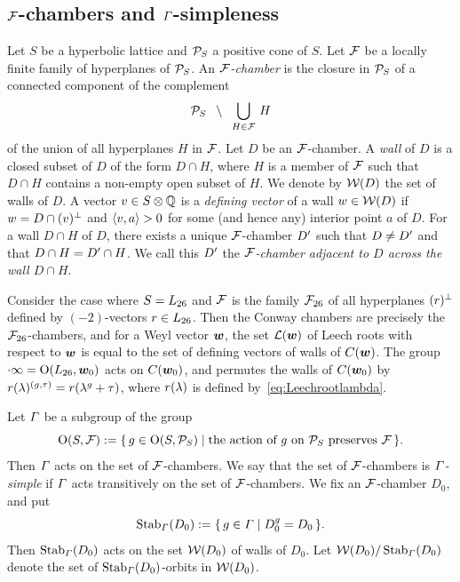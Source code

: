 \documentclass{amsart} %
\begin{document}
\subsection{$\mathord{\mathcal{F}}$-chambers and $\varGamma$-simpleness}\label{subsec:FFF}
%
%
Let $S$ be a hyperbolic lattice
and $\mathord{\mathcal{P}}_S$ a positive cone of $S$.
Let $\mathord{\mathcal{F}}$ be a locally finite family of hyperplanes of $\mathord{\mathcal{P}}_S$.
An \emph{$\mathord{\mathcal{F}}$-chamber} is the closure in $\mathord{\mathcal{P}}_S$ of a connected component 
of the complement
\[
\mathord{\mathcal{P}}_S\;\;\setminus \;\; \bigcup_{H\in \mathord{\mathcal{F}}}\, H
\]
of the union of all hyperplanes $H$ in $\mathord{\mathcal{F}}$.
Let $D$ be an $\mathord{\mathcal{F}}$-chamber.
A \emph{wall} of $D$ is a closed subset of $D$
of the form $D\cap H$, where $H$ is a member of $\mathord{\mathcal{F}}$
such that $D\cap H$ contains a non-empty open subset of $H$.
We denote by $\mathord{\mathcal{W}}(D)$ the set of walls of $D$.
A vector $v\in S\otimes\mathord{\mathbb{Q}}$ is a \emph{defining vector} of a wall $w\in \mathord{\mathcal{W}}(D)$ 
if $w=D\cap (v)^{\perp}$ and $\langle v, a \rangle>0$ for some (and hence any) interior point $a$ of $D$.
For a wall $D\cap H$ of $D$,
there exists a unique $\mathord{\mathcal{F}}$-chamber $D^{\prime}$
such that $D\ne D^{\prime}$ and that $D\cap H=D^{\prime}\cap H$.
We call this $D^{\prime}$ the \emph{$\mathord{\mathcal{F}}$-chamber adjacent to $D$ across the wall $D\cap H$}.
%
\begin{example}
Consider the case where $S=L_{26}$ and $\mathord{\mathcal{F}}$ is the family ${\mathord{\mathcal{F}}}_{26}$ of all hyperplanes $(r)^{\perp}$
defined by $(-2)$-vectors $r\in L_{26}$.
Then the Conway chambers are precisely the ${\mathord{\mathcal{F}}}_{26}$-chambers,
and for a Weyl vector $\boldsymbol{w}$,
the set $\mathord{\mathcal{L}}(\boldsymbol{w})$ of Leech roots with respect to $\boldsymbol{w}$ is equal to 
the set of 
defining vectors of walls of $\mathord{C}(\boldsymbol{w})$.
The group $\cdot \infty=\mathord{\mathrm{O}}(L_{26}, \boldsymbol{w}_0)$ 
acts on $\mathord{C}(\boldsymbol{w}_0)$, and 
 permutes 
the walls of $\mathord{C}(\boldsymbol{w}_0)$ by
$r(\lambda)^{(g, \tau)}=r(\lambda^g+\tau)$,
where $r(\lambda)$ is %
defined by~\eqref{eq:Leechrootlambda}.
\end{example}
%
Let $\varGamma$ be a subgroup
of the group 
\[
\mathord{\mathrm{O}}(S, \mathord{\mathcal{F}}):=\{\,{g\in \mathord{\mathrm{O}}(S, \mathord{\mathcal{P}}_S)}\mid {\textrm{the action of $g$ on $\mathord{\mathcal{P}}_S$ preserves $\mathord{\mathcal{F}}$}} \,\}.
\]
%
%
Then $\varGamma$ acts on the set of $\mathord{\mathcal{F}}$-chambers.
We say that the set of $\mathord{\mathcal{F}}$-chambers is \emph{$\varGamma$-simple}
if $\varGamma$ acts transitively on the set of $\mathord{\mathcal{F}}$-chambers.
We fix an $\mathord{\mathcal{F}}$-chamber $D_0$, and put
\[
\operatorname{Stab}_{\varGamma}(D_0):=\{\,{g\in \varGamma}\mid {D_0^g=D_0} \,\}.
\]
Then $\operatorname{Stab}_{\varGamma}(D_0)$ acts on the set $\mathord{\mathcal{W}}(D_0)$ of walls of $D_0$.
Let $\mathord{\mathcal{W}}(D_0)/\operatorname{Stab}_{\varGamma}(D_0)$ denote the set of 
$\operatorname{Stab}_{\varGamma}(D_0)$-orbits in $\mathord{\mathcal{W}}(D_0)$.
\end{document}
